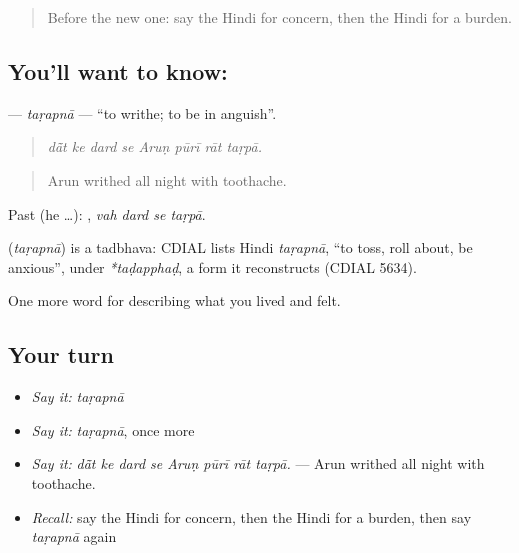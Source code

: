 \label{lesson:HI-C458-tarapna}



\begin{quote}
Before the new one: say the Hindi for concern, then the Hindi for a burden.
\end{quote}

\subsection*{You'll want to know: }
\textbf{} — \emph{taṛapnā} — \textquotedblleft{}to writhe; to be in anguish\textquotedblright{}.

\begin{quote}
       
\end{quote}

\begin{quote}
\emph{dā̃t ke dard se Aruṇ pūrī rāt taṛpā.}
\end{quote}

\begin{quote}
Arun writhed all night with toothache.
\end{quote}

Past (he …):    , \emph{vah dard se taṛpā}.

\begin{cousinweb}
\textbf{} (\emph{taṛapnā}) is a tadbhava: CDIAL lists Hindi \emph{taṛapnā}, \textquotedblleft{}to toss, roll about, be anxious\textquotedblright{}, under \emph{*taḍapphaḍ}, a form it reconstructs (CDIAL 5634).
\end{cousinweb}

\begin{grammarlens}[title={What you've built}]
One more word for describing what you lived and felt.
\end{grammarlens}

\subsection*{Your turn}
\begin{itemize}
\raggedright
  \item \emph{Say it:} \emph{taṛapnā}
  \item \emph{Say it:} \emph{taṛapnā}, once more
  \item \emph{Say it:} \emph{dā̃t ke dard se Aruṇ pūrī rāt taṛpā.} — Arun writhed all night with toothache.
  \item \emph{Recall:} say the Hindi for concern, then the Hindi for a burden, then say \emph{taṛapnā} again
\end{itemize}

